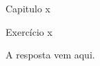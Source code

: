 \documentclass[12pt,a4paper]{article}
\begin{document}
%
%
Capitulo x

%
%
Exercício x

\begin{solution}
%
%
A resposta vem aqui.

\end{solution}
\end{document}
